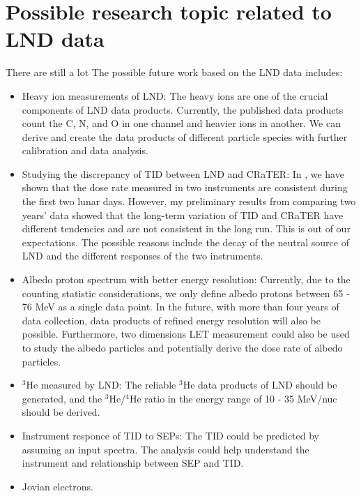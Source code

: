 \section*{Possible research topic related to LND data}
There are still a lot 
The possible future work based on the \ac{LND} data includes:
\begin{itemize}

    \item Heavy ion measurements of \ac{LND}: The heavy ions are one of the crucial components of \ac{LND} data products. Currently, the published data products count the C, N, and O in one channel and heavier ions in another. We can derive and create the data products of different particle species with further calibration and data analysis.
    \item Studying the discrepancy of \ac{TID} between \ac{LND} and \ac{CRaTER}: In \citet{Zhang2020SciAdv}, we have shown that the dose rate measured in two instruments are consistent during the first two lunar days. However, my preliminary results from comparing two years' data showed that the long-term variation of \ac{TID} and \ac{CRaTER} have different tendencies and are not consistent in the long run. This is out of our expectations. The possible reasons include the decay of the neutral source of \ac{LND} and the different responses of the two instruments.
    \item Albedo proton spectrum with better energy resolution: Currently, due to the counting statistic considerations, we only define albedo protons between 65 - 76 MeV as a single data point. In the future, with more than four years of data collection, data products of refined energy resolution will also be possible. Furthermore, two dimensions \ac{LET} measurement could also be used to study the albedo particles and potentially derive the dose rate of albedo particles.
    \item $^3$He measured by \ac{LND}: The reliable $^3$He data products of \ac{LND} should be generated, and the $^3$He/$^4$He ratio in the energy range of 10 - 35 MeV/nuc should be derived.
    \item Instrument responce of \ac{TID} to \acp{SEP}: The \ac{TID} could be predicted by assuming an input spectra. The analysis could help understand the instrument and relationship between \ac{SEP} and \ac{TID}.
    \item Jovian electrons.



\end{itemize}

